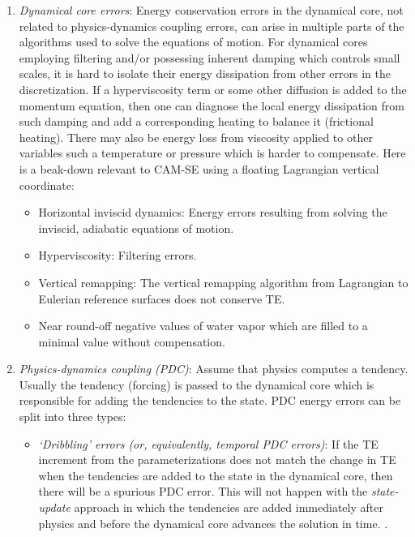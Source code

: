 \documentclass[draft,linenumbers]{agujournal}
\begin{document}
\begin{enumerate}
\item {\em{Dynamical core errors}}: Energy conservation errors in the dynamical core, not related to physics-dynamics coupling errors, can arise in multiple parts of the algorithms used to solve the equations of motion. For dynamical cores employing filtering \citep[e.g., limiters in flux operators ][]{L2004MWR} and/or possessing inherent damping which controls small scales, it is hard to isolate their energy dissipation from other errors in the discretization. If a hyperviscosity term or some other diffusion is added to the momentum equation, then one can diagnose the local energy dissipation from such damping and add a corresponding heating to balance it (frictional heating). There may also be energy loss from viscosity applied to other variables such a temperature or pressure which is harder to compensate. Here is a beak-down relevant to CAM-SE using a floating Lagrangian vertical coordinate:
\begin{itemize}
\item Horizontal inviscid dynamics: Energy errors resulting from solving the inviscid, adiabatic equations of motion.
\item Hyperviscosity: Filtering errors.
\item Vertical remapping: The vertical remapping algorithm from Lagrangian to Eulerian reference surfaces does not conserve TE.
\item Near round-off negative values of water vapor which are filled to a minimal value without compensation.
\end{itemize}
    {}    
\item \label{item:pdc}{\em{Physics-dynamics coupling (PDC)}}: Assume that physics computes a tendency. Usually the tendency (forcing) is passed to the dynamical core which is responsible for adding the tendencies to the state. PDC energy errors can be split into three types:
\begin{itemize}
\item {\em{`Dribbling' errors (or, equivalently, temporal PDC errors)}}: If the TE increment from the parameterizations does not match the change in TE when the tendencies are added to the state in the dynamical core, then there will be a spurious PDC error. This will not happen with the {\em{state-update}} approach in which the tendencies are added immediately after physics and before the dynamical core advances the solution in time. {\color{red}{The PDC `dribblin' errors can be split into 3 contributions:}}.


\end{itemize}
\end{enumerate}
\end{document}
